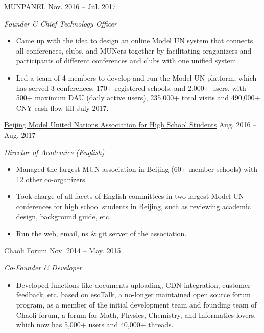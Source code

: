 \documentclass[hidelinks__VERSION__]{adamyi-cv}
\begin{document}
\begin{entrylist}

\entry
{\href{https://www.munpanel.com}{MUNPANEL}}
{Nov. 2016 -- Jul. 2017}
{\emph{Founder \& Chief Technology Officer}
\begin{itemize}
\item Came up with the idea to design an online Model UN system that connects all conferences, clubs, and MUNers together by facilitating oraganizers and participants of different conferences and clubs with one unified system.
\item Led a team of 4 members to develop and run the Model UN platform, which has served 3 conferences, 170+ registered schools, and 2,000+ users, with 500+ maximum DAU (daily active users), 235,000+ total visits and 490,000+ CNY cash flow till July 2017.
\end{itemize}}


\entry
{\href{https://bjmun.org}{Beijing Model United Nations Association for High School Students}}
{Aug. 2016 -- Aug. 2017}
{\emph{Director of Academics (English)}
\begin{itemize}
\item Managed the largest MUN association in Beijing (60+ member schools) with 12 other co-organizers.
\item Took charge of all facets of English committees in two largest Model UN conferences for high school students in Beijing, such as reviewing academic design, background guide, etc.
\item Run the web, email, ns \& git server of the association.
\end{itemize}}


\entry
{Chaoli Forum}
{Nov. 2014 -- May. 2015}
{\emph{Co-Founder \& Developer}
\begin{itemize}
\item Developed functions like documents uploading, CDN integration, customer feedback, etc. based on esoTalk, a no-longer maintained open source forum program, as a member of the initial development team and founding team of Chaoli forum, a forum for Math, Physics, Chemistry, and Informatics lovers, which now has 5,000+ users and 40,000+ threads.
\end{itemize}}




\end{entrylist}
\end{document}
